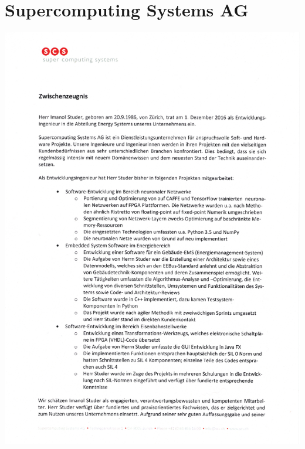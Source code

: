 \enlargethispage{12pt}
\section{Supercomputing Systems AG}
\includegraphics[width=\textwidth]{pictures/scs_zwischenzeugnis/page0.png}
\newpage

